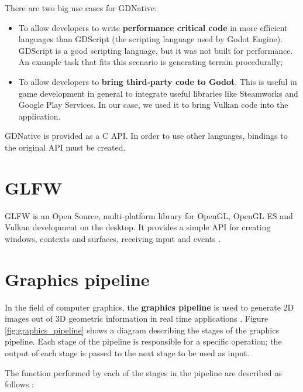 There are two big use cases for GDNative:

\begin{itemize}
    \item To allow developers to write \textbf{performance critical code} in more efficient languages than GDScript (the scripting language used by Godot Engine). GDScript is a good scripting language, but it was not built for performance. An example task that fits this scenario is generating terrain procedurally;
    \item To allow developers to \textbf{bring third-party code to Godot}. This is useful in game development in general to integrate useful libraries like Steamworks and Google Play Services. In our case, we used it to bring Vulkan code into the application.
\end{itemize}

GDNative is provided as a C API. In order to use other languages, bindings to the original API must be created.

\section{GLFW}
GLFW is an Open Source, multi-platform library for OpenGL, OpenGL ES and Vulkan development on the desktop. It provides a simple API for creating windows, contexts and surfaces, receiving input and events \cite{glfw}.

\section{Graphics pipeline}
In the field of computer graphics, the \textbf{graphics pipeline} is used to generate 2D images out of 3D geometric information in real time applications \cite{shirley_fcg:2002}. Figure \ref{fig:graphics_pipeline} shows a diagram describing the stages of the graphics pipeline. Each stage of the pipeline is responsible for a specific operation; the output of each stage is passed to the next stage to be used as input.

The function performed by each of the stages in the pipeline are described as follows \cite{vulkan_tutorial}:

